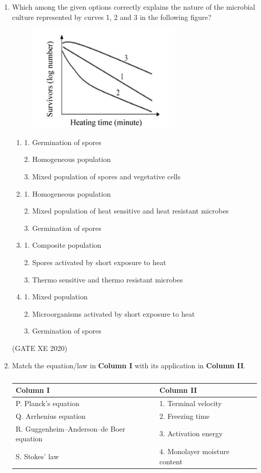 \documentclass[12pt]{article}
\begin{document}
\begin{enumerate}
\item Which among the given options correctly explains the nature of the microbial culture represented by curves 1, 2 and 3 in the following figure?

\begin{figure}[H]
    \centering
    \includegraphics[width=0.5\columnwidth]{figs/ass4_g_q15.png}
    \caption{}
    \label{fig:placeholder}
\end{figure}

\begin{enumerate}
\item 
1. Germination of spores 

2. Homogeneous population 

3. Mixed population of spores and vegetative cells

\item 
1. Homogeneous population 

2. Mixed population of heat sensitive and heat resistant microbes 

3. Germination of spores

\item 
1. Composite population 

2. Spores activated by short exposure to heat 

3. Thermo sensitive and thermo resistant microbes

\item 
1. Mixed population 

2. Microorganisms activated by short exposure to heat 

3. Germination of spores
\end{enumerate}
(GATE XE 2020)

\item Match the equation/law in \textbf{Column I} with its application in \textbf{Column II}.
\begin{table}[H]
\centering
\caption{}
\label{}
\begin{tabular}{|l|l|}
\hline
Column I & Column II \\
\hline
P. Planck's equation & 1. Terminal velocity \\
Q. Arrhenius equation & 2. Freezing time \\
R. Guggenheim--Anderson--de Boer equation & 3. Activation energy \\
S. Stokes' law & 4. Monolayer moisture content \\
\hline
\end{tabular}
\end{table}


\end{enumerate}
\end{document}
